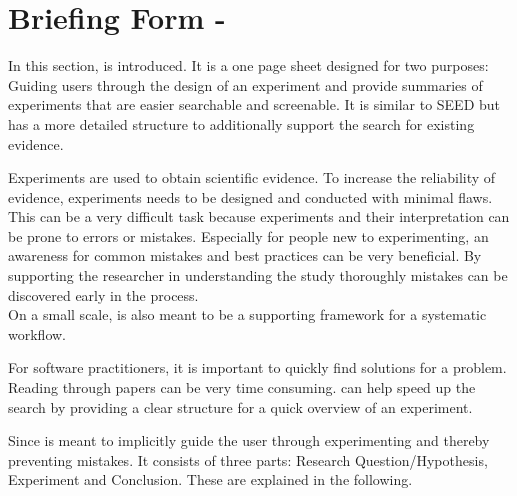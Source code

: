 
\section{Briefing Form - \briefingform}
\label{sec:briefing form}

In this section, \textit{\briefingform} is introduced. It is a one page sheet designed for two purposes: Guiding users through the design of an experiment and provide summaries of experiments that are easier searchable and screenable. It is similar to SEED but has a more detailed structure to additionally support the search for existing evidence.

Experiments are used to obtain scientific evidence. To increase the reliability of evidence, experiments needs to be designed and conducted with minimal flaws. This can be a very difficult task because experiments and their interpretation can be prone to errors or mistakes. Especially for people new to experimenting, an awareness for common mistakes and best practices can be very beneficial. By supporting the researcher in understanding the study thoroughly mistakes can be discovered early in the process.\\
On a small scale, \briefingform is also meant to be a  supporting framework for a systematic workflow.

For software practitioners, it is important to quickly find solutions for a problem. Reading through papers can be very time consuming. \briefingform can help speed up the search by providing a clear structure for a quick overview of an experiment.

Since \briefingform is meant to implicitly guide the user through experimenting and thereby preventing mistakes. It consists of three parts: Research Question/Hypothesis, Experiment and Conclusion. These are explained in the following.
